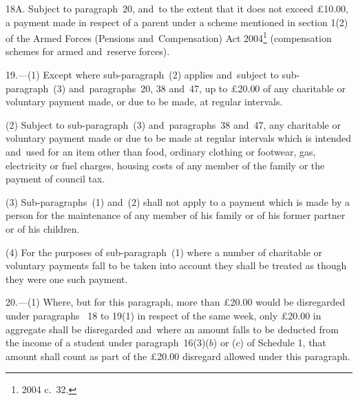 \documentclass[12pt,a4paper]{article}
\begin{document}

\medskip

18A.  Subject to paragraph~20, and~to the extent that it does not exceed £10$.$00, a payment made in respect of a parent under a scheme mentioned in section 1(2) of the Armed Forces (Pensions and~Compensation) Act 2004\footnote{2004 c.\ 32.} (compensation schemes for armed and~reserve forces).


\medskip

19.—(1) Except where sub-paragraph~(2) applies and~subject to sub-\hspace{0pt}paragraph~(3) and~paragraphs~20, 38 and~47, 
up to £20$.$00  %
of any charitable or voluntary payment made, or due to be made, at regular intervals.

(2) Subject to sub-paragraph~(3) and~paragraphs~38 and~47, any charitable or voluntary payment made or due to be made at regular intervals which is intended and~used for an item other than food, ordinary clothing or footwear, gas, electricity or fuel charges, housing costs of any member of the family or the payment of council tax.

(3) Sub-paragraphs~(1) and~(2) shall not apply to a payment which is made by a person for the maintenance of any member of his family or of his former partner or of his children.

(4) For the purposes of sub-paragraph~(1) where a number of charitable or voluntary payments fall to be taken into account they shall be treated as though they were one such payment.


\medskip

20.—(1) Where, but for this paragraph, more than 
£20$.$00  %
would be disregarded under paragraphs~
18 to 19(1)  %
in respect of the same week, only 
£20$.$00  %
in aggregate shall be disregarded and~where an amount falls to be deducted from the income of a student under paragraph~16(3)($b$) or ($c$) of Schedule 1, that amount shall count as part of the 
£20$.$00  %
disregard allowed under this paragraph.
\end{document}
